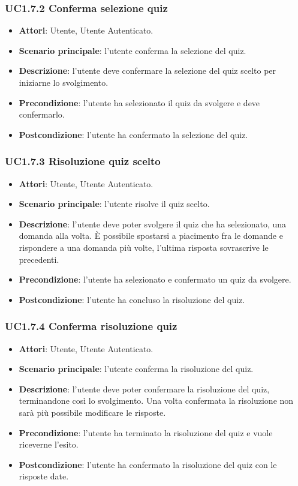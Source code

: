 \subsubsection{UC1.7.2 Conferma selezione quiz}
\begin{itemize}
\item \textbf{Attori}: Utente, Utente Autenticato.
\item \textbf{Scenario principale}: l'utente conferma la selezione del quiz.
\item \textbf{Descrizione}: l'utente deve confermare la selezione del quiz scelto per iniziarne lo svolgimento.
\item \textbf{Precondizione}: l'utente ha selezionato il quiz da svolgere e deve confermarlo.
\item \textbf{Postcondizione}: l'utente ha confermato la selezione del quiz.
\end{itemize}
\subsubsection{UC1.7.3 Risoluzione quiz scelto}
\begin{itemize}
\item \textbf{Attori}: Utente, Utente Autenticato.
\item \textbf{Scenario principale}: l'utente risolve il quiz scelto.
\item \textbf{Descrizione}: l'utente deve poter svolgere il quiz che ha selezionato, una domanda alla volta. È possibile spostarsi a piacimento fra le domande e rispondere a una domanda più volte, l'ultima risposta sovrascrive le precedenti.
\item \textbf{Precondizione}: l'utente ha selezionato e confermato un quiz da svolgere.
\item \textbf{Postcondizione}: l'utente ha concluso la risoluzione del quiz.
\end{itemize}
\subsubsection{UC1.7.4 Conferma risoluzione quiz}
\begin{itemize}
\item \textbf{Attori}: Utente, Utente Autenticato.
\item \textbf{Scenario principale}: l'utente conferma la risoluzione del quiz.
\item \textbf{Descrizione}: l'utente deve poter confermare la risoluzione del quiz, terminandone così lo svolgimento. Una volta confermata la risoluzione non sarà più possibile modificare le risposte.
\item \textbf{Precondizione}:  l'utente ha terminato la risoluzione del quiz e vuole riceverne l'esito.
\item \textbf{Postcondizione}: l'utente ha confermato la risoluzione del quiz con le risposte date.
\end{itemize}
